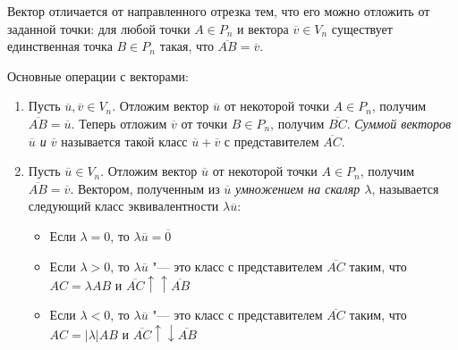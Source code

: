 \begin{note}
	Вектор отличается от направленного отрезка тем, что его можно отложить от заданной точки: для любой точки $A \in P_n$ и вектора $\overline v \in V_n$ существует единственная точка $B \in P_n$ такая, что $\overline{AB} = \overline{v}$.
\end{note}

\begin{definition}
	Основные операции с векторами:
	\begin{enumerate}
		\item Пусть $\overline u, \overline v \in V_n$. Отложим вектор $\overline{u}$ от некоторой точки $A \in P_n$, получим $\overline{AB} = \overline{u}$. Теперь отложим $\overline{v}$ от точки $B \in P_n$, получим $\overline{BC}$. \textit{Суммой векторов $\overline{u}$ и $\overline{v}$} называется такой класс $\overline{u} + \overline{v}$ с представителем $\overline{AC}$.
		
		\item Пусть $\overline u \in V_n$. Отложим вектор $\overline{u}$ от некоторой точки $A \in P_n$, получим $\overline{AB} = \overline{v}$. Вектором, полученным из $\overline u$ \textit{умножением на скаляр $\lambda$}, называется следующий класс эквивалентности $\lambda \overline{u}$:
		\begin{itemize}
			\item Если $\lambda = 0$, то $\lambda \overline{u} = \overline{0}$
			\item Если $\lambda > 0$, то $\lambda \overline{u}$ "--- это класс с представителем $\overline{AC}$ таким, что $AC = \lambda AB$ и $\overline{AC} \uparrow\uparrow \overline{AB}$
			\item Если $\lambda < 0$, то $\lambda \overline{u}$ "--- это класс с представителем $\overline{AC}$ таким, что $AC = |\lambda| AB$ и $\overline{AC} \uparrow\downarrow \overline{AB}$
		\end{itemize}
	\end{enumerate}
\end{definition}

